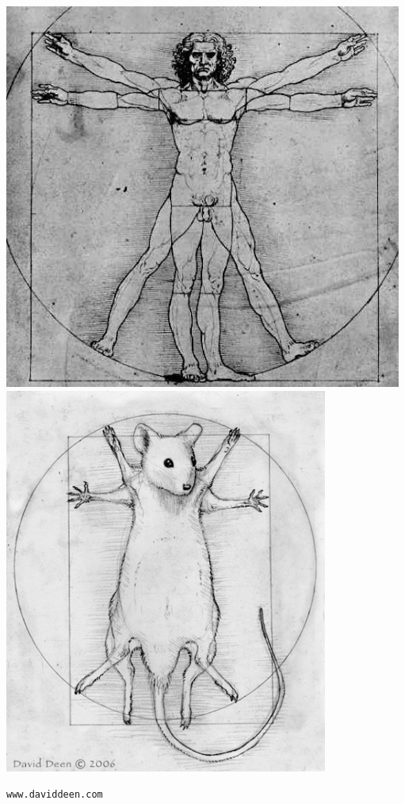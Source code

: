 \documentclass[12pt]{article}
\newcommand{\smallestsize}{\fontsize{18}{22} \selectfont}
\begin{document}
\centerline{
\includegraphics[height=5in]{Figs/da-vinci-man.jpg}
\includegraphics[height=5in]{Figs/vitruvian_mouse.jpg}
}

{\color{myblue} \smallestsize \hfill \verb|www.daviddeen.com| \hspace*{11mm}}
\end{document}
